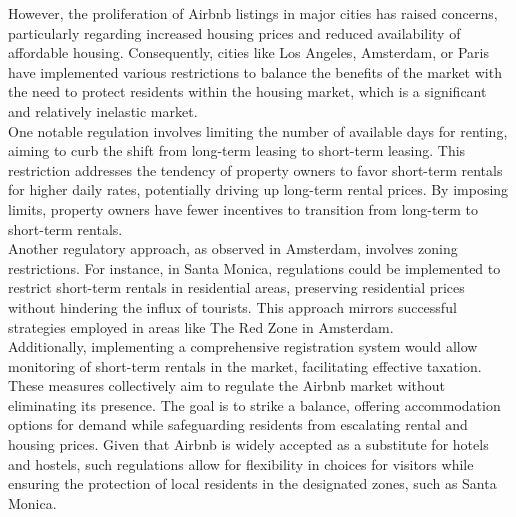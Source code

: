 However, the proliferation of Airbnb listings in major cities has raised concerns, particularly regarding increased housing prices and reduced availability of affordable housing. Consequently, cities like Los Angeles, Amsterdam, or Paris have implemented various restrictions to balance the benefits of the market with the need to protect residents within the housing market, which is a significant and relatively inelastic market.\\

One notable regulation involves limiting the number of available days for renting, aiming to curb the shift from long-term leasing to short-term leasing. This restriction addresses the tendency of property owners to favor short-term rentals for higher daily rates, potentially driving up long-term rental prices. By imposing limits, property owners have fewer incentives to transition from long-term to short-term rentals.\\

Another regulatory approach, as observed in Amsterdam, involves zoning restrictions. For instance, in Santa Monica, regulations could be implemented to restrict short-term rentals in residential areas, preserving residential prices without hindering the influx of tourists. This approach mirrors successful strategies employed in areas like The Red Zone in Amsterdam.\\

Additionally, implementing a comprehensive registration system would allow monitoring of short-term rentals in the market, facilitating effective taxation. These measures collectively aim to regulate the Airbnb market without eliminating its presence. The goal is to strike a balance, offering accommodation options for demand while safeguarding residents from escalating rental and housing prices. Given that Airbnb is widely accepted as a substitute for hotels and hostels, such regulations allow for flexibility in choices for visitors while ensuring the protection of local residents in the designated zones, such as Santa Monica.\\
